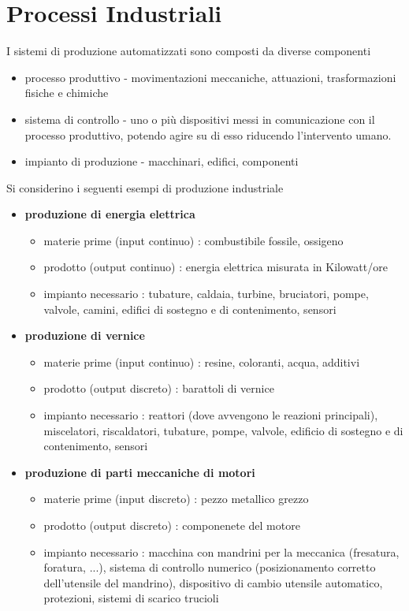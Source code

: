 \documentclass[10pt, letterpaper]{report}
\begin{document}
\section{Processi Industriali}
I sistemi di produzione automatizzati sono composti da 
diverse componenti\begin{itemize}
    \item processo produttivo - movimentazioni meccaniche, attuazioni, 
    trasformazioni fisiche e chimiche 
    \item sistema di controllo - uno o più dispositivi messi in comunicazione 
    con il processo produttivo, potendo agire su di esso riducendo 
    l'intervento umano. 
    \item impianto di produzione - macchinari, edifici, componenti
\end{itemize}
Si considerino i seguenti esempi di produzione industriale\begin{itemize}
    \item \textbf{produzione di energia elettrica} \begin{itemize}
        \item materie prime (input continuo) : combustibile fossile, ossigeno 
        \item prodotto (output continuo) : energia elettrica misurata in Kilowatt/ore
        \item impianto necessario : tubature, caldaia, turbine, bruciatori, pompe, valvole, camini, edifici di
        sostegno e di contenimento, sensori
        
    \end{itemize}
    \item \textbf{produzione di vernice} \begin{itemize}
        \item materie prime (input continuo) : resine, coloranti, acqua, additivi
        \item prodotto (output discreto) : barattoli di vernice
        \item impianto necessario : reattori (dove avvengono le reazioni principali), miscelatori, riscaldatori,
        tubature, pompe, valvole, edificio di sostegno e di contenimento, sensori
    \end{itemize}
    \item \textbf{produzione di parti meccaniche di motori} \begin{itemize}
        \item materie prime (input discreto) : pezzo metallico grezzo
        \item prodotto (output discreto) : componenete del motore
        \item impianto necessario : macchina con mandrini per la meccanica (fresatura, foratura, ...), sistema di
        controllo numerico (posizionamento corretto dell’utensile del mandrino),
        dispositivo di cambio utensile automatico, protezioni, sistemi di scarico
        trucioli
    \end{itemize}
\end{itemize}
\end{document}
